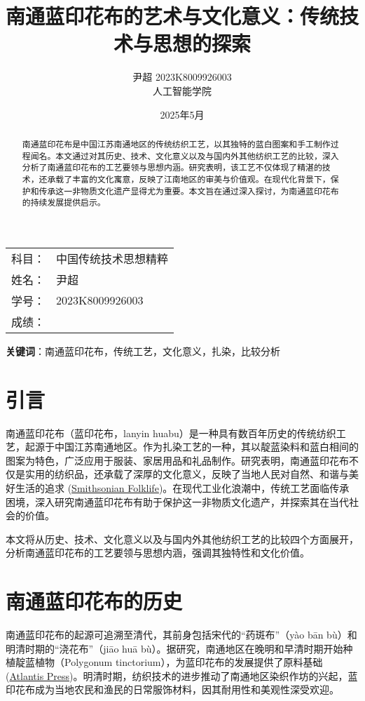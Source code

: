 \documentclass[12pt]{article}
\begin{document}
\title{南通蓝印花布的艺术与文化意义：传统技术与思想的探索}
\author{尹超 2023K8009926003 \\
        人工智能学院}

\date{2025年5月}
\maketitle

\vspace{1em}
\begin{tabular}{@{}ll}
科目： & 中国传统技术思想精粹 \\
姓名： & 尹超 \\
学号： & 2023K8009926003 \\
成绩： &  \\
\end{tabular}

\begin{abstract}
南通蓝印花布是中国江苏南通地区的传统纺织工艺，以其独特的蓝白图案和手工制作过程闻名。本文通过对其历史、技术、文化意义以及与国内外其他纺织工艺的比较，深入分析了南通蓝印花布的工艺要领与思想内涵。研究表明，该工艺不仅体现了精湛的技术，还承载了丰富的文化寓意，反映了江南地区的审美与价值观。在现代化背景下，保护和传承这一非物质文化遗产显得尤为重要。本文旨在通过深入探讨，为南通蓝印花布的持续发展提供启示。
\end{abstract}

\textbf{关键词}：南通蓝印花布，传统工艺，文化意义，扎染，比较分析

\section{引言}
南通蓝印花布（蓝印花布，lanyin huabu）是一种具有数百年历史的传统纺织工艺，起源于中国江苏南通地区。作为扎染工艺的一种，其以靛蓝染料和蓝白相间的图案为特色，广泛应用于服装、家居用品和礼品制作。研究表明，南通蓝印花布不仅是实用的纺织品，还承载了深厚的文化意义，反映了当地人民对自然、和谐与美好生活的追求 (\href{https://folklife.si.edu/magazine/blue-calico-cloth-nantong-china}{Smithsonian Folklife})。在现代工业化浪潮中，传统工艺面临传承困境，深入研究南通蓝印花布有助于保护这一非物质文化遗产，并探索其在当代社会的价值。

本文将从历史、技术、文化意义以及与国内外其他纺织工艺的比较四个方面展开，分析南通蓝印花布的工艺要领与思想内涵，强调其独特性和文化价值。

\section{南通蓝印花布的历史}
南通蓝印花布的起源可追溯至清代，其前身包括宋代的“药斑布”（yào bān bù）和明清时期的“浇花布”（jiāo huā bù）。据研究，南通地区在晚明和早清时期开始种植靛蓝植物（Polygonum tinctorium），为蓝印花布的发展提供了原料基础 (\href{https://www.atlantis-press.com/proceedings/hss-17/25873402}{Atlantis Press})。明清时期，纺织技术的进步推动了南通地区染织作坊的兴起，蓝印花布成为当地农民和渔民的日常服饰材料，因其耐用性和美观性深受欢迎。
\end{document}
